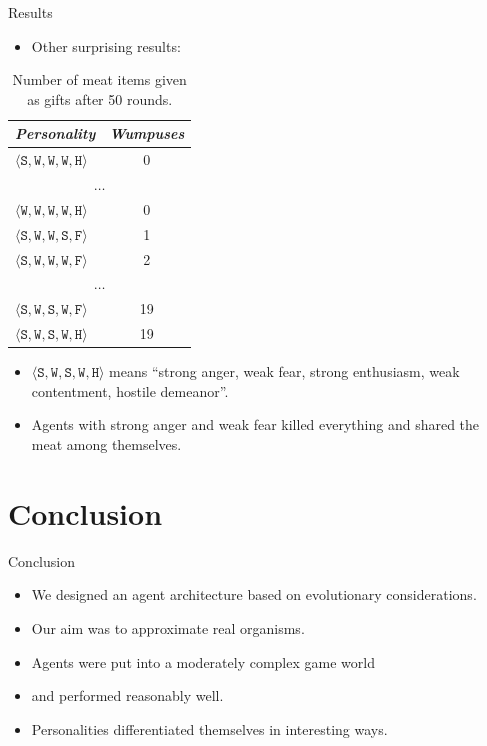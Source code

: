 \documentclass{beamer}
\newcommand{\tuple}[1]{\ensuremath{\langle #1 \rangle}}
\newcommand{\type}[1]{\mathtt{#1}}
\newcommand{\personality}[5]{\tuple{\type{#1},\type{#2}, \type{#3}, \type{#4}, \type{#5}}}
\begin{document}
   \begin{frame}{Results}
      \begin{itemize}
         \item Other surprising results:
      \end{itemize}
      
      \begin{table}
         \centering
            \begin{tabular}{ l | c }
               \emph{Personality} & \emph{Wumpuses} \\
               \hline

					$\personality{S}{W}{W}{W}{H}$ & 0\\
               \multicolumn{2}{c}{$\dots$}\\
               $\personality{W}{W}{W}{W}{H}$ & 0\\
               $\personality{S}{W}{W}{S}{F}$ & 1\\
               $\personality{S}{W}{W}{W}{F}$ & 2\\
               \multicolumn{2}{c}{$\dots$}\\
               $\personality{S}{W}{S}{W}{F}$ & 19\\
               $\personality{S}{W}{S}{W}{H}$ & 19\\
               \hline
            \end{tabular}
            \caption{Number of meat items given as gifts after 50 rounds.}
            \label{tab:numWumpuses}
      \end{table}
      
      \begin{itemize}
         \item $\personality{S}{W}{S}{W}{H}$ means ``strong anger, weak fear, strong enthusiasm, weak contentment, hostile demeanor''.
         \item Agents with strong anger and weak fear killed everything and shared the meat among themselves.
      \end{itemize}
   \end{frame}
   
   \section{Conclusion}
   
   \begin{frame}{Conclusion}
      \begin{itemize}
         \item We designed an agent architecture based on evolutionary considerations.
         \pause
         \item Our aim was to approximate real organisms.
         \pause
         \item Agents were put into a moderately complex game world
         \pause
         \item and performed reasonably well.
         \pause
         \item Personalities differentiated themselves in interesting ways.
      \end{itemize}
   \end{frame}
   
\end{document}
